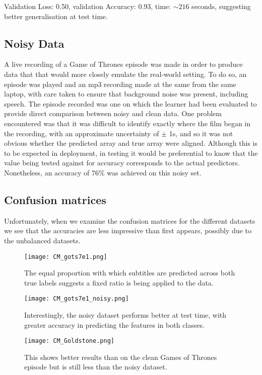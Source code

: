 Validation Loss: 0.50, validation Accuracy: 0.93, time: $\sim216$ seconds, suggesting better generalisation at test time.

\subsection{Noisy Data}
A live recording of a Game of Thrones episode was made in order to produce data that that would more closely emulate the real-world setting. To do so, an episode was played and an mp3 recording made at the same from the same laptop, with care taken to ensure that background noise was present, including speech. The episode recorded was one on which the learner had been evaluated to provide direct comparison between noisy and clean data. One problem encountered was that it was difficult to identify exactly where the film began in the recording, with an approximate uncertainty of $\pm$ 1s, and so it was not obvious whether the predicted array and true array were aligned. Although this is to be expected in deployment, in testing it would be preferential to know that the value being tested against for accuracy corresponds to the actual predictors. Nonetheless, an accuracy of 76\% was achieved on this noisy set.

\subsection{Confusion matrices}
Unfortunately, when we examine the confusion matrices for the different datasets we see that the accuracies are less impressive than first appears, possibly due to the unbalanced datasets.

\begin{figure}[h]
	\centering
	\texttt{[image: CM\_gots7e1.png]}
	\caption{The equal proportion with which subtitles are predicted across both true labels suggests a fixed ratio is being applied to the data.}
	\label{cms7e1}
\end{figure}

\begin{figure}[h]
	\centering
	\texttt{[image: CM\_gots7e1\_noisy.png]}
	\caption{Interestingly, the noisy dataset performs better at test time, with greater accuracy in predicting the features in both classes.}
	\label{cms7e1noise}
\end{figure}

\begin{figure}[h]
	\centering
	\texttt{[image: CM\_Goldstone.png]}
	\caption{This shows better results than on the clean Games of Thrones episode but is still less than the noisy dataset.}
	\label{cmsgoldstone}
\end{figure}



